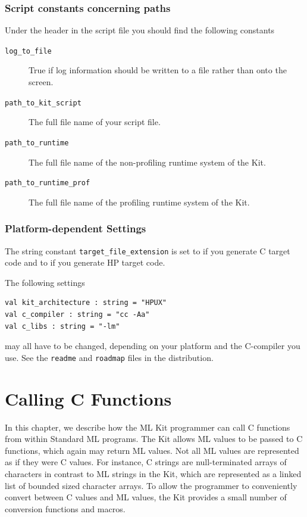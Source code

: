 \documentclass[12pt]{book}
\begin{document}
\subsection{Script constants concerning paths}
\label{paths.sec}
Under the header  in the script file you should
find the following constants
\begin{description}
\item[{\tt log\_to\_file}] True if log information should be written
to a file rather than onto the screen.
\item[{\tt path\_to\_kit\_script}] The full file name of 
your script file.
\item[{\tt path\_to\_runtime}] The full file name of the non-profiling
runtime system of the Kit.
\item[{\tt path\_to\_runtime\_prof}] The full file name of the profiling
runtime system of the Kit.
\end{description}
\subsection{Platform-dependent Settings}
\label{cflags.sec}
The string constant {\tt target\_file\_extension} is set to
 if you generate C target code and to 
if you generate HP target code.

The following settings
\begin{verbatim}
val kit_architecture : string = "HPUX"
val c_compiler : string = "cc -Aa"
val c_libs : string = "-lm"
\end{verbatim}
may all have to be changed, depending on your platform and
the C-compiler you use.  See the {\tt readme} and {\tt roadmap} files 
in the distribution.

\chapter{Calling C Functions}
\label{ccall.sec}

In this chapter, we describe how the ML Kit programmer can call C
functions from within Standard ML programs.  The Kit allows ML values
to be passed to C functions, which again may return ML values. Not all
ML values are represented as if they were C values. For instance, C
strings are null-terminated arrays of characters in contrast to ML
strings in the Kit, which are represented as a linked list of bounded
sized character arrays. To allow the programmer to conveniently
convert between C values and ML values, the Kit provides a small
number of conversion functions and macros.
\end{document}
